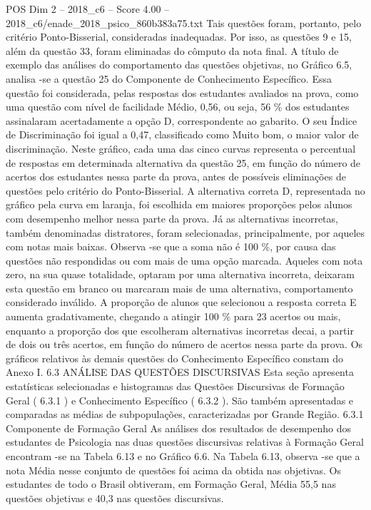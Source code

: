 \begin{textsample}{POS Dim 2 – 2018\_c6 – Score 4.00 – 2018\_c6/enade\_2018\_psico\_860b383a75.txt}
Tais questões foram, portanto, pelo critério Ponto-Bisserial, consideradas inadequadas.
Por isso, as questões 9 e 15, além da questão 33, foram eliminadas do cômputo da nota final.
A título de exemplo das análises do comportamento das questões objetivas, no Gráfico 6.5, analisa -se a questão 25 do Componente de Conhecimento Específico.
Essa questão foi considerada, pelas respostas dos estudantes avaliados na prova, como uma questão com nível de facilidade Médio, 0,56, ou seja, 56 \% dos estudantes assinalaram acertadamente a opção D, correspondente ao gabarito.
O seu Índice de Discriminação foi igual a 0,47, classificado como Muito bom, o maior valor de discriminação.
Neste gráfico, cada uma das cinco curvas representa o percentual de respostas em determinada alternativa da questão 25, em função do número de acertos dos estudantes nessa parte da prova, antes de possíveis eliminações de questões pelo critério do Ponto-Bisserial.
A alternativa correta D, representada no gráfico pela curva em laranja, foi escolhida em maiores proporções pelos alunos com desempenho melhor nessa parte da prova.
Já as alternativas incorretas, também denominadas distratores, foram selecionadas, principalmente, por aqueles com notas mais baixas.
Observa -se que a soma não é 100 \%, por causa das questões não respondidas ou com mais de uma opção marcada.
Aqueles com nota zero, na sua quase totalidade, optaram por uma alternativa incorreta, deixaram esta questão em branco ou marcaram mais de uma alternativa, comportamento considerado inválido.
A proporção de alunos que selecionou a resposta correta E aumenta gradativamente, chegando a atingir 100 \% para 23 acertos ou mais, enquanto a proporção dos que escolheram alternativas incorretas decai, a partir de dois ou três acertos, em função do número de acertos nessa parte da prova.
Os gráficos relativos às demais questões do Conhecimento Específico constam do Anexo I. 6.3 ANÁLISE DAS QUESTÕES DISCURSIVAS Esta seção apresenta estatísticas selecionadas e histogramas das Questões Discursivas de Formação Geral ( 6.3.1 ) e Conhecimento Específico ( 6.3.2 ).
São também apresentadas e comparadas as médias de subpopulações, caracterizadas por Grande Região. 6.3.1 Componente de Formação Geral As análises dos resultados de desempenho dos estudantes de Psicologia nas duas questões discursivas relativas à Formação Geral encontram -se na Tabela 6.13 e no Gráfico 6.6.
Na Tabela 6.13, observa -se que a nota Média nesse conjunto de questões foi acima da obtida nas objetivas.
Os estudantes de todo o Brasil obtiveram, em Formação Geral, Média 55,5 nas questões objetivas e 40,3 nas questões discursivas.

\end{textsample}
